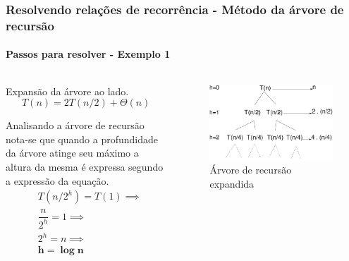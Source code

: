 \begin{frame}
	\frametitle{Resolvendo relações de recorrência - Método da árvore de recursão}
	\framesubtitle{Passos para resolver - Exemplo 1}
	\begin{columns}
		\begin{column}{0.5\textwidth}
			\par Expansão da árvore ao lado.
			\begin{equation}
				T(n)=2T(n/2) + \Theta(n)
			\end{equation}
			\par Analisando a árvore de recursão nota-se que quando a profundidade da árvore atinge seu máximo a altura da mesma é expressa segundo a expressão da equação.
			\begin{equation}
				\begin{aligned}
				&T(n/2^h)=T(1) \implies \\
				&\dfrac{n}{2^h} = 1 \implies \\
				&2^h = n \implies \\
				&\mathbf{h = \log n}
				\end{aligned}
			\end{equation}
		\end{column}
		\begin{column}{0.5\textwidth}
			\begin{figure}
				\centering
				\includegraphics[width=\linewidth]{images/arvoreDeRecusao01}
				\caption{Árvore de recursão expandida}
				\label{fig:arvorederecusao01}
			\end{figure}
		\end{column}
	\end{columns}
\end{frame}


